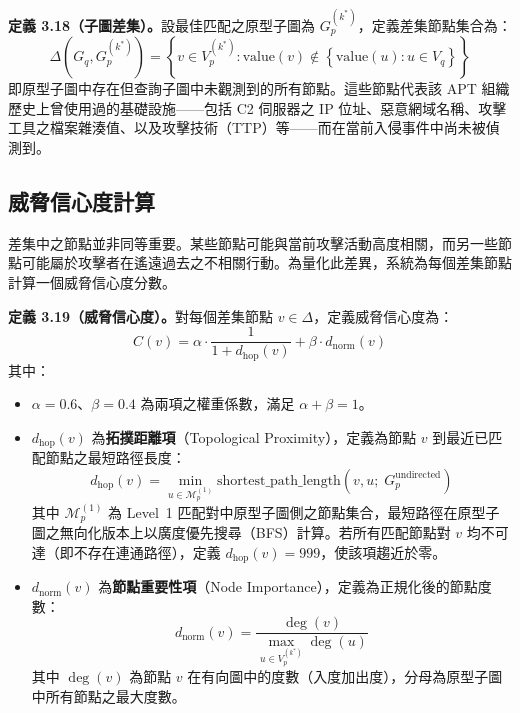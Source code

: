 \begin{ZhChapter}
\noindent\textbf{定義 3.18（子圖差集）。}設最佳匹配之原型子圖為 $G_p^{(k^*)}$，定義差集節點集合為：
\begin{equation}
    \Delta(G_q, G_p^{(k^*)}) = \left\{v \in V_p^{(k^*)} : \text{value}(v) \notin \left\{\text{value}(u) : u \in V_q\right\}\right\}
    \label{eq:subgraph-diff}
\end{equation}
即原型子圖中存在但查詢子圖中未觀測到的所有節點。這些節點代表該 APT 組織歷史上曾使用過的基礎設施——包括 C2 伺服器之 IP 位址、惡意網域名稱、攻擊工具之檔案雜湊值、以及攻擊技術（TTP）等——而在當前入侵事件中尚未被偵測到。

\subsection{威脅信心度計算}
\label{subsec:confidence}

差集中之節點並非同等重要。某些節點可能與當前攻擊活動高度相關，而另一些節點可能屬於攻擊者在遙遠過去之不相關行動。為量化此差異，系統為每個差集節點計算一個威脅信心度分數。

\noindent\textbf{定義 3.19（威脅信心度）。}對每個差集節點 $v \in \Delta$，定義威脅信心度為：
\begin{equation}
    C(v) = \alpha \cdot \frac{1}{1 + d_{\text{hop}}(v)} + \beta \cdot d_{\text{norm}}(v)
    \label{eq:confidence}
\end{equation}
其中：
\begin{itemize}
    \item $\alpha = 0.6$、$\beta = 0.4$ 為兩項之權重係數，滿足 $\alpha + \beta = 1$。
    \item $d_{\text{hop}}(v)$ 為\textbf{拓撲距離項}（Topological Proximity），定義為節點 $v$ 到最近已匹配節點之最短路徑長度：
    \begin{equation}
        d_{\text{hop}}(v) = \min_{u \in \mathcal{M}_p^{(1)}} \text{shortest\_path\_length}(v, u;\; G_p^{\text{undirected}})
        \label{eq:hop-dist}
    \end{equation}
    其中 $\mathcal{M}_p^{(1)}$ 為 Level~1 匹配對中原型子圖側之節點集合，最短路徑在原型子圖之無向化版本上以廣度優先搜尋（BFS）計算。若所有匹配節點對 $v$ 均不可達（即不存在連通路徑），定義 $d_{\text{hop}}(v) = 999$，使該項趨近於零。
    \item $d_{\text{norm}}(v)$ 為\textbf{節點重要性項}（Node Importance），定義為正規化後的節點度數：
    \begin{equation}
        d_{\text{norm}}(v) = \frac{\deg(v)}{\max_{u \in V_p^{(k^*)}} \deg(u)}
        \label{eq:degree-norm}
    \end{equation}
    其中 $\deg(v)$ 為節點 $v$ 在有向圖中的度數（入度加出度），分母為原型子圖中所有節點之最大度數。
\end{itemize}


\end{ZhChapter}
